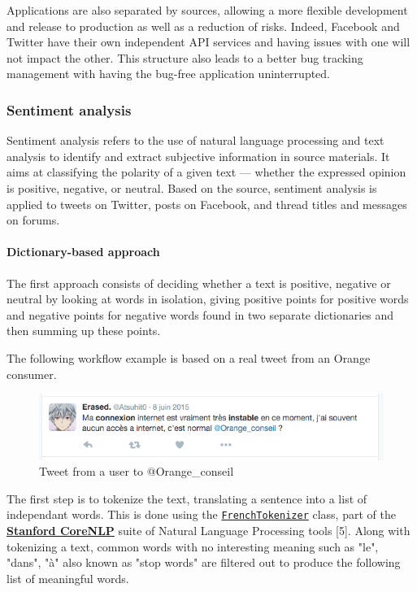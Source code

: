 \documentclass[11pt]{article}
\begin{document}
Applications are also separated by sources, allowing a more flexible development and release to production as well as a reduction of risks. Indeed, \textsf{Facebook} and \textsf{Twitter} have their own independent API services and having issues with one will not impact the other. This structure also leads to a better bug tracking management with having the bug-free application uninterrupted.

\subsubsection{Sentiment analysis}

Sentiment analysis refers to the use of natural language processing and text analysis to identify and extract subjective information in source materials. It aims at classifying the polarity of a given text — whether the expressed opinion is positive, negative, or neutral. 
Based on the source, sentiment analysis is applied to tweets on \textsf{Twitter}, posts on \textsf{Facebook}, and thread titles and messages on forums.

\paragraph{Dictionary-based approach}

The first approach consists of deciding whether a text is positive, negative or neutral by looking at words in isolation, giving positive points for positive words and negative points for negative words found in two separate dictionaries and then summing up these points.

The following workflow example is based on a real tweet from an \textsf{Orange} consumer.

\begin{figure}[h!]
    \centering
    \includegraphics[scale=0.6]{img/tweet1.png}
    \caption{Tweet from a user to \textsf{@Orange\_conseil}}
    \label{tweet1}
\end{figure}

The first step is to tokenize the text, translating a sentence into a list of independant words. This is done using the  \href{https://github.com/stanfordnlp/CoreNLP/blob/master/src/edu/stanford/nlp/international/french/process/FrenchTokenizer.java}{\texttt{FrenchTokenizer}} class, part of the \href{https://stanfordnlp.github.io/CoreNLP}{\textsf{\textbf{Stanford CoreNLP}}} suite of Natural Language Processing tools [5]. Along with tokenizing a text, common words with no interesting meaning such as "le", "dans", "à" also known as "stop words" are filtered out to produce the following list of meaningful words.
\end{document}
